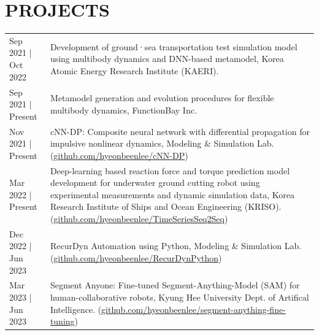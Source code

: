 \documentclass[a4paper,10pt]{extarticle}
\begin{document}
\section*{PROJECTS}
\noindent
{}
\vspace*{-.5cm}
\begin{longtable}{LR}
    {Sep 2021 | Oct 2022} & Development of ground·sea transportation test simulation model using multibody dynamics and DNN-based metamodel, Korea Atomic Energy Research Institute (KAERI).                                                                                                                                                                                   \\
    {Sep 2021 | Present}  & Metamodel generation and evolution procedures for flexible multibody dynamics, FunctionBay Inc.                                                                                                                                                                                                                                                    \\
    {Nov 2021 | Present}  & cNN-DP: Composite neural network with differential propagation for impulsive nonlinear dynamics, Modeling \& Simulation Lab. (\href{https://github.com/hyeonbeenlee/cNN-DP}{github.com/hyeonbeenlee/cNN-DP})                                                                                                                                       \\
    {Mar 2022 | Present}  & Deep-learning based reaction force and torque prediction model development for underwater ground cutting robot using experimental measurements and dynamic simulation data, Korea Research Institute of Ships and Ocean Engineering (KRISO). (\href{https://github.com/hyeonbeenlee/TimeSeriesSeq2Seq}{github.com/hyeonbeenlee/TimeSeriesSeq2Seq}) \\
    {Dec 2022 | Jun 2023} & RecurDyn Automation using Python, Modeling \& Simulation Lab. (\href{https://github.com/hyeonbeenlee/RecurDynPython}{github.com/hyeonbeenlee/RecurDynPython})                                                                                                                                                                                      \\
    {Mar 2023 | Jun 2023}   & Segment Anyone: Fine-tuned Segment-Anything-Model (SAM) for human-collaborative robots, Kyung Hee University Dept. of Artifical Intelligence. (\href{https://github.com/hyeonbeenlee/segment-anything-fine-tuning}{github.com/hyeonbeenlee/segment-anything-fine-tuning})                                                                          \\
\end{longtable}
\end{document}
